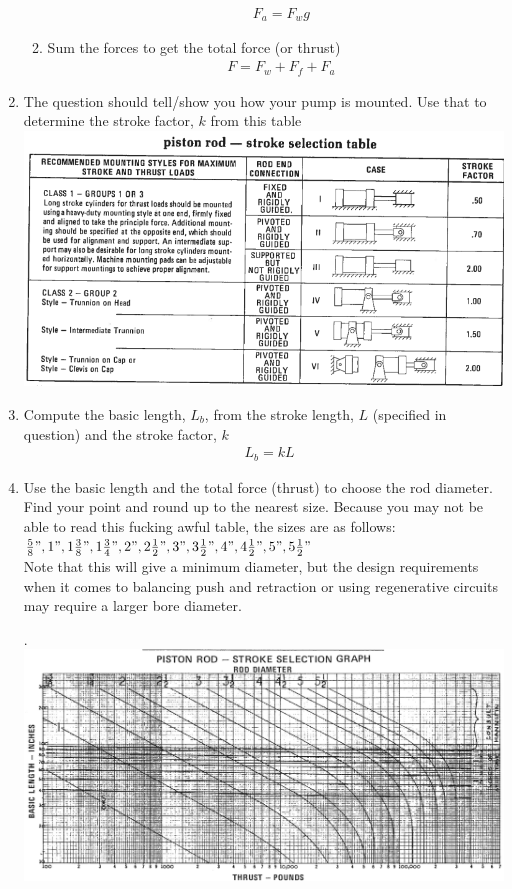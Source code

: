 \documentclass[11pt, fleqn]{article}
\begin{document}
\begin{enumerate}
\begin{enumerate}
        \begin{align*}
            &F_a=F_wg
        \end{align*}
        \item Sum the forces to get the total force (or thrust)
        \begin{align*}
            &F=F_w+F_f+F_a
        \end{align*}
    \end{enumerate}
    \item The question should tell/show you how your pump is mounted. Use that to determine the stroke factor, $k$ from this table\\
    \includegraphics[scale=1]{Fluids/tabB4.png}
    \item Compute the basic length, $L_b$, from the stroke length, $L$ (specified in question) and the stroke factor, $k$
    \begin{align*}
        &L_b=kL
    \end{align*}
    \item Use the basic length and the total force (thrust) to choose the rod diameter. Find your point and round up to the nearest size. Because you may not be able to read this fucking awful table, the sizes are as follows:\\
    $\frac{5}{8}",1",1\frac{3}{8}",1\frac{3}{4}",2",2\frac{1}{2}",3",3\frac{1}{2}",4",4\frac{1}{2}",5",5\frac{1}{2}"$\\

    Note that this will give a minimum diameter, but the design requirements when it comes to balancing push and retraction or using regenerative circuits may require a larger bore diameter.
    
    .\hspace{-3cm}\includegraphics[scale=0.85]{Fluids/b1.png}


\end{enumerate}
\end{document}
